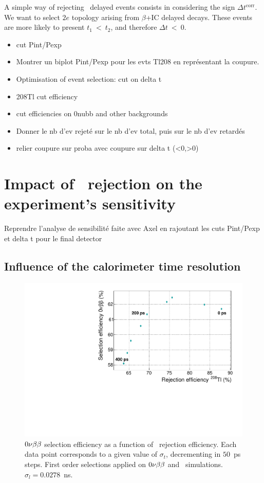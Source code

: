 A simple way of rejecting \Tl\ delayed events consists in considering the sign $\Delta t^{\text{corr}}$.
We want to select $2e$ topology arising from $\beta$+IC delayed decays.
These events are more likely to present $t_{1}~<~t_{2}$, and therefore $\Delta t~<~0$.

\begin{itemize}
\item cut Pint/Pexp
\item Montrer un biplot Pint/Pexp pour les evts Tl208 en représentant la coupure.
\item Optimisation of event selection: cut on delta t
\item 208Tl cut efficiency
\item cut efficiencies on 0nubb and other backgrounds
\item Donner le nb d'ev rejeté sur le nb d'ev total, puis sur le nb d'ev retardés
\item relier coupure sur proba avec coupure sur delta t (<0,>0)
\end{itemize}

\section{Impact of \Tl\ rejection on the experiment's sensitivity}
Reprendre l'analyse de sensibilité faite avec Axel en rajoutant les cuts Pint/Pexp et delta t pour le final detector

\subsection{Influence of the calorimeter time resolution}

\begin{figure}
  \centering
  \includegraphics[width=13cm]{timedifference/fig_timediff/efficiency_proba.pdf}
  \caption{$0\nu\beta\beta$ selection efficiency as a function of \Tl\ rejection efficiency.
    Each data point corresponds to a given value of $\sigma_{t}$, decrementing in $50$~ps steps.
    First order selections applied on $0\nu\beta\beta$ and \Tl\ simulations.
    $\sigma_{l}=0.0278$~ns.
    \label{fig:eff_proba_sigma}}
\end{figure}

